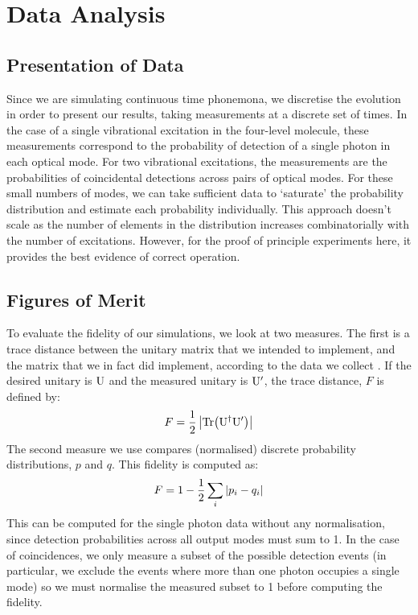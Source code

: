 \section{Data Analysis}
\subsection{Presentation of Data}
Since we are simulating continuous time phonemona, we discretise the evolution
in order to present our results, taking measurements at a discrete set of times.
In the case of a single vibrational excitation in the four-level molecule,
these measurements correspond to the probability of detection of a single
photon in each optical mode. For two vibrational excitations, the measurements
are the probabilities of coincidental detections across pairs of optical modes.
For these small numbers of modes, we can take sufficient data to `saturate' the
probability distribution and estimate each probability individually. This
approach doesn't scale as the number of elements in the distribution increases
combinatorially with the number of excitations. However, for the proof of
principle experiments here, it provides the best evidence of correct operation.

\subsection{Figures of Merit}
To evaluate the fidelity of our simulations, we look at two measures. The first
is a trace distance between the unitary matrix that we intended to implement,
and the matrix that we in fact did implement, according to the data we collect
\cite{sst}. If the desired unitary is \(\mathrm{U}\) and the measured unitary
is \(\mathrm{U^{\prime}}\), the trace distance, \(F\) is defined by:
\[F=\frac{1}{2}\left|\mathrm{Tr}\!\left(\mathrm{U}^{\dagger}{\mathrm{U}^{\prime}}\right)\right|\]
The second measure we use compares (normalised) discrete probability
distributions, \(p\) and \(q\). This fidelity is computed as:
\[F=1-\frac{1}{2}\sum_{i}\left|p_{i}-q_{i}\right|\]
This can be computed for the single photon data without any normalisation, since
detection probabilities across all output modes must sum to 1. In the case of
coincidences, we only measure a subset of the possible detection events (in
particular, we exclude the events where more than one photon occupies a single
mode) so we must normalise the measured subset to 1 before computing the
fidelity.


